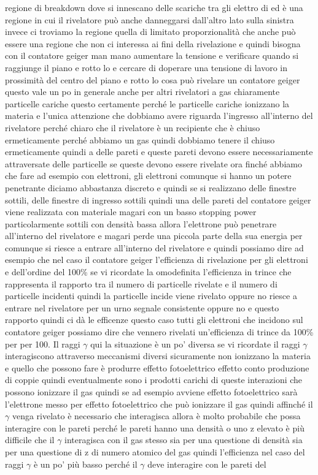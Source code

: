 {regione di breakdown dove si innescano delle scariche tra gli elettro di ed è una regione in cui il rivelatore può anche danneggarsi dall'altro lato sulla sinistra invece ci troviamo la regione quella di limitato proporzionalità che anche può essere una regione che non ci interessa ai fini della rivelazione e quindi bisogna con il contatore geiger man mano aumentare la tensione e verificare quando si raggiunge il piano e rotto lo e cercare di doperare una tensione di lavoro in prossimità del centro del piano e rotto lo cosa può rivelare un contatore geiger questo vale un po in generale anche per altri rivelatori a gas chiaramente particelle cariche questo certamente perché le particelle cariche ionizzano la materia e l'unica attenzione che dobbiamo avere riguarda l'ingresso all'interno del rivelatore perché chiaro che il rivelatore è un recipiente che è chiuso ermeticamente perché abbiamo un gas quindi dobbiamo tenere il chiuso ermeticamente quindi a delle pareti e queste pareti devono essere necessariamente attraversate delle particelle se queste devono essere rivelate ora finché abbiamo che fare ad esempio con elettroni, gli elettroni comunque si hanno un potere penetrante diciamo abbastanza discreto e quindi se si realizzano delle finestre sottili, delle finestre di ingresso sottili quindi una delle pareti del contatore geiger viene realizzata con materiale magari con un basso stopping power particolarmente sottili con densità bassa allora l'elettrone può penetrare all'interno del rivelatore e magari perde una piccola parte della sua energia per comunque si riesce a entrare all'interno del rivelatore e quindi possiamo dire ad esempio che nel caso il contatore geiger l'efficienza di rivelazione per gli elettroni e dell'ordine del 100\% se vi ricordate la omodefinita l'efficienza in trince che rappresenta il rapporto tra il numero di particelle rivelate e il numero di particelle incidenti quindi la particelle incide viene rivelato oppure no riesce a entrare nel rivelatore per un urno segnale consistente oppure no e questo rapporto quindi ci dà le efficenze questo caso tutti gli elettroni che incidono sul contatore geiger possiamo dire che vennero rivelati un'efficienza di trince da 100\% per per 100. Il raggi $\gamma$ qui la situazione è un po' diversa se vi ricordate il raggi $\gamma$ interagiscono attraverso meccanismi diversi sicuramente non ionizzano la materia e quello che possono fare è produrre effetto fotoelettrico effetto conto produzione di coppie quindi eventualmente sono i prodotti carichi di queste interazioni che possono ionizzare il gas quindi se ad esempio avviene effetto fotoelettrico sarà l'elettrone messo per effetto fotoelettrico che può ionizzare il gas quindi affinché il $\gamma$ venga rivelato è necessario che interagisca allora è molto probabile che possa interagire con le pareti perché le pareti hanno una densità o uno z elevato è più difficile che il $\gamma$ interagisca con il gas stesso sia per una questione di densità sia per una questione di z di numero atomico del gas quindi l'efficienza nel caso del raggi $\gamma$ è un po' più basso perché il $\gamma$ deve interagire con le pareti del 

}
